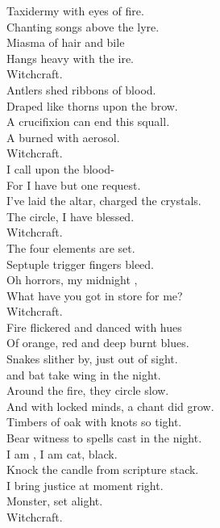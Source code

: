 Taxidermy with eyes of fire. \\
Chanting songs above the lyre. \\
Miasma of hair and bile \\
Hangs heavy with the  ire. \\
Witchcraft. \\

Antlers shed ribbons of blood. \\
Draped like thorns upon the brow. \\
A crucifixion can end this squall. \\
A  burned with aerosol. \\
Witchcraft. \\

I call upon the blood-  \\
For I have but one request. \\
I've laid the altar, charged the crystals. \\
The circle, I have blessed. \\
Witchcraft. \\

The four elements are set. \\
Septuple trigger fingers bleed. \\
Oh horrors, my midnight , \\
What have you got in store for me? \\
Witchcraft. \\

Fire flickered and danced with hues \\
Of orange, red and deep burnt blues. \\
Snakes slither by, just out of sight. \\
 and bat take wing in the night. \\
Around the fire, they circle slow. \\
And with locked minds, a chant did grow. \\
Timbers of oak with knots so tight. \\
Bear witness to spells cast in the night. \\

I am , I am cat, black. \\
Knock the candle from scripture stack. \\
I bring justice at moment right. \\
 Monster, set alight. \\
Witchcraft. \\


